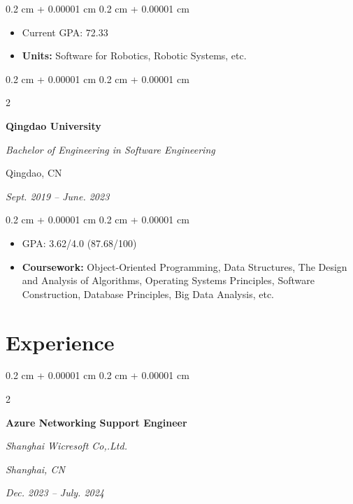 \documentclass[10pt, letterpaper]{article}
\newenvironment{highlights}{
    \begin{itemize}[
        topsep=0.10 cm,
        parsep=0.10 cm,
        partopsep=0pt,
        itemsep=0pt,
        leftmargin=0.4 cm + 10pt
    ]
}{
    \end{itemize}
} %
\newenvironment{onecolentry}{
    \begin{adjustwidth}{
        0.2 cm + 0.00001 cm
    }{
        0.2 cm + 0.00001 cm
    }
}{
    \end{adjustwidth}
} %
\newenvironment{twocolentry}[2][]{
    \onecolentry
    \def\secondColumn{#2}
    \setcolumnwidth{\fill, 6 cm}
    \begin{paracol}{2}
}{
    \switchcolumn \raggedleft \secondColumn
    \end{paracol}
    \endonecolentry
} %
\begin{document}
        \vspace{0.10 cm}
        \begin{onecolentry}
            \begin{highlights}
                \item Current GPA: 72.33
                \item \textbf{Units:} Software for Robotics, Robotic Systems, etc.
            \end{highlights}
        \end{onecolentry}
        \vspace{0.20 cm}

\begin{twocolentry}{
         Qingdao, CN   
            
        \textit{Sept. 2019 – June. 2023}}
            \textbf{Qingdao University}

            \textit{Bachelor of Engineering in Software Engineering}
        \end{twocolentry}

        \vspace{0.10 cm}
        \begin{onecolentry}
            \begin{highlights}
                \item GPA: 3.62/4.0 (87.68/100)
                \item \textbf{Coursework:} Object-Oriented Programming, Data Structures, The Design and Analysis of Algorithms, 
Operating Systems Principles, Software Construction, Database Principles, Big Data Analysis, etc.
            \end{highlights}
        \end{onecolentry}


    
    \section{Experience}



        
        \begin{twocolentry}{
        \textit{Shanghai, CN}    
            
        \textit{Dec. 2023 – July. 2024}}
            \textbf{Azure Networking Support Engineer }
            
            \textit{Shanghai Wicresoft Co,.Ltd.}
        \end{twocolentry}
\end{document}
